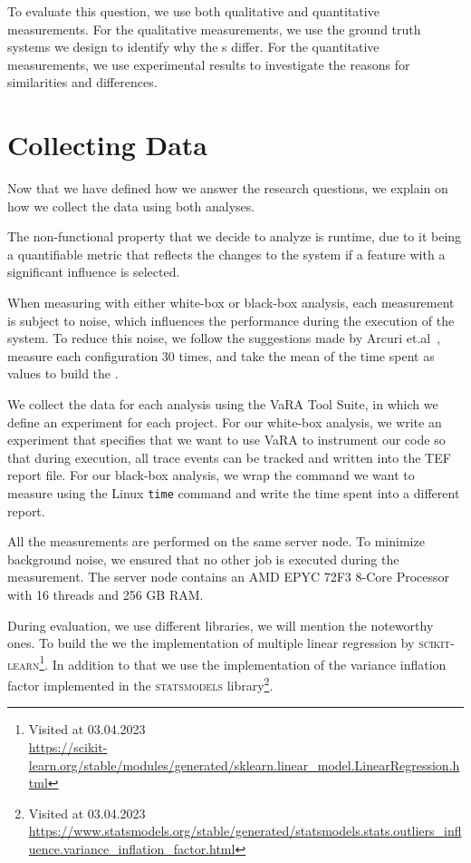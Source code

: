 To evaluate this question, we use both qualitative and quantitative measurements. 
For the qualitative measurements, we use the ground truth systems we design to identify why the {\perfInfluenceModel}s differ. 
For the quantitative measurements, we use experimental results to investigate the reasons for similarities and differences.

\section{Collecting Data}\label{ch:collect-data}
Now that we have defined how we answer the research questions, we explain on how we collect the data using both analyses.

The non-functional property that we decide to analyze is runtime, due to it being a quantifiable metric
that reflects the changes to the system if a feature with a significant influence is selected.

When measuring with either white-box or black-box analysis, 
each measurement is subject to noise, which influences the performance during the execution of the system. 
To reduce this noise, we follow the suggestions made by Arcuri et.al~\cite{SampleSize}, 
measure each configuration 30 times, and take the mean of the time spent as values to build the {\perfInfluenceModel}.

We collect the data for each analysis using the VaRA Tool Suite, in which we define an experiment for each project. 
For our white-box analysis, we write an experiment that specifies that we want to use VaRA to instrument our code so that during execution, 
all trace events can be tracked and written into the TEF report file. For our black-box analysis, 
we wrap the command we want to measure using the Linux \texttt{time} command and write the time spent into a different report. 

All the measurements are performed on the same server node. To minimize background noise, we ensured that no other job is executed during the measurement. 
The server node contains an AMD EPYC 72F3 8-Core Processor with 16 threads and 256 GB RAM.

During evaluation, we use different libraries, we will mention the noteworthy ones.
To build the {\perfInfluenceModel} we the implementation of multiple linear regression by \textsc{scikit-learn}\footnote{Visited at 03.04.2023\\ \url{https://scikit-learn.org/stable/modules/generated/sklearn.linear_model.LinearRegression.html}}.
In addition to that we use the implementation of the variance inflation factor implemented in the \textsc{statsmodels} library\footnote{Visited at 03.04.2023\\ \url{https://www.statsmodels.org/stable/generated/statsmodels.stats.outliers_influence.variance_inflation_factor.html}}.

